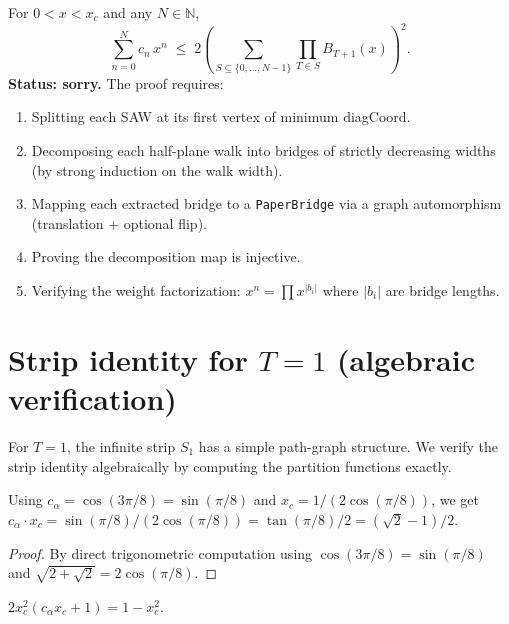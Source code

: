 \begin{lemma}
\begin{theorem}\label{thm:hw_decomp}
  For $0 < x < x_c$ and any $N \in \mathbb{N}$,
  \[
    \sum_{n=0}^{N} c_n \, x^n
    \;\leq\;
    2 \left(
      \sum_{S \subseteq \{0,\ldots,N{-}1\}}
      \prod_{T \in S} B_{T+1}(x)
    \right)^{\!2}.
  \]
  \textbf{Status: sorry.}
  The proof requires:
  \begin{enumerate}
  \item Splitting each SAW at its first vertex of minimum diagCoord.
  \item Decomposing each half-plane walk into bridges of strictly
    decreasing widths (by strong induction on the walk width).
  \item Mapping each extracted bridge to a \texttt{PaperBridge}
    via a graph automorphism (translation + optional flip).
  \item Proving the decomposition map is injective.
  \item Verifying the weight factorization:
    $x^n = \prod x^{|b_i|}$ where $|b_i|$ are bridge lengths.
  \end{enumerate}
\end{theorem}

\section{Strip identity for $T=1$ (algebraic verification)}\label{sec:strip_T1}

For $T=1$, the infinite strip $S_1$ has a simple path-graph structure.
We verify the strip identity algebraically by computing the partition
functions exactly.

\begin{lemma}[$c_\alpha \cdot x_c = (\sqrt{2}-1)/2$]\label{lem:c_alpha_mul_xc}
\leanok
{}
  Using $c_\alpha = \cos(3\pi/8) = \sin(\pi/8)$ and
  $x_c = 1/(2\cos(\pi/8))$, we get
  $c_\alpha \cdot x_c = \sin(\pi/8)/(2\cos(\pi/8)) = \tan(\pi/8)/2 = (\sqrt{2}-1)/2$.
\end{lemma}
\begin{proof}
\leanok
  By direct trigonometric computation using $\cos(3\pi/8) = \sin(\pi/8)$
  and $\sqrt{2+\sqrt{2}} = 2\cos(\pi/8)$.
\end{proof}

\begin{lemma}[Algebraic identity for $T=1$ strip]\label{lem:strip_T1_alg}
\leanok
{}
  $2x_c^2(c_\alpha x_c + 1) = 1 - x_c^2$.


\end{lemma}
\end{lemma}
